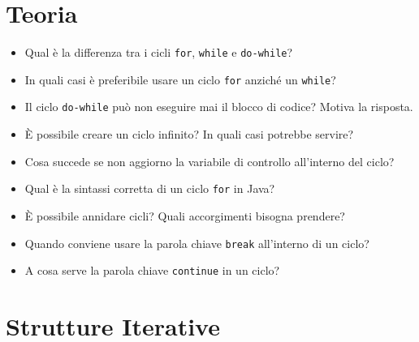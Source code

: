 \documentclass{article}
\begin{document}
\section{Teoria}

\begin{itemize}
    \item Qual è la differenza tra i cicli \texttt{for}, \texttt{while} e \texttt{do-while}?
    \item In quali casi è preferibile usare un ciclo \texttt{for} anziché un \texttt{while}?
    \item Il ciclo \texttt{do-while} può non eseguire mai il blocco di codice? Motiva la risposta.
    \item È possibile creare un ciclo infinito? In quali casi potrebbe servire?
    \item Cosa succede se non aggiorno la variabile di controllo all'interno del ciclo?
    \item Qual è la sintassi corretta di un ciclo \texttt{for} in Java?
    \item È possibile annidare cicli? Quali accorgimenti bisogna prendere?
    \item Quando conviene usare la parola chiave \texttt{break} all'interno di un ciclo?
    \item A cosa serve la parola chiave \texttt{continue} in un ciclo?
\end{itemize}

\section{Strutture Iterative}
\end{document}
